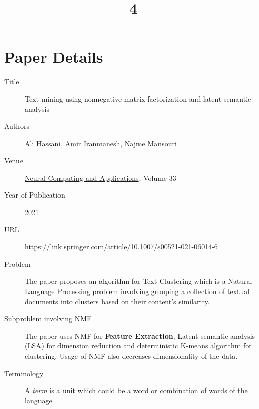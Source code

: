 \documentclass[a4paper]{article}
\title{4}
\date{}
\begin{document}
\maketitle
\section{Paper Details}
\begin{description}
	\item[Title] Text mining using nonnegative matrix factorization and latent semantic analysis
	\item[Authors] {Ali Hassani}, {Amir Iranmanesh}, {Najme Mansouri}
	\item[Venue] \href{https://link.springer.com/journal/521}{Neural Computing and Applications}, Volume 33
	\item[Year of Publication] 2021
	\item[URL] \url{https://link.springer.com/article/10.1007/s00521-021-06014-6}
	\item[Problem] The paper proposes an algorithm for Text Clustering which is a Natural Language Processing problem involving grouping a collection of textual documents into clusters based on their content's similarity. 
	\item[Subproblem involving NMF] The paper uses NMF for \textbf{Feature Extraction}, Latent semantic analysis (LSA) for dimension reduction and deterministic K-means algorithm for clustering. Usage of NMF also decreases dimensionality of the data.
	\item[Terminology] 
	A \emph{term} is a unit which could be a word or combination of words of the language.


\end{description}
\end{document}
